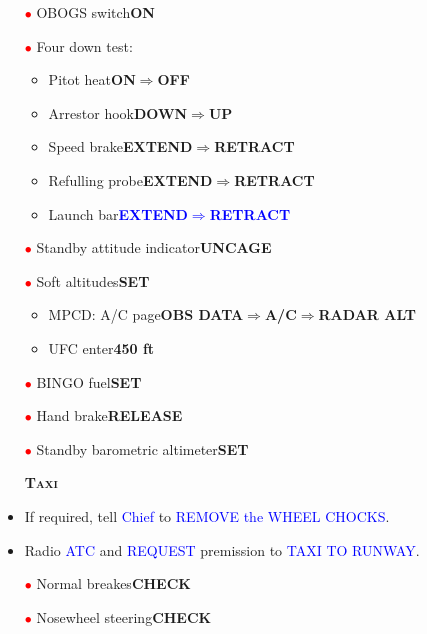 \documentclass[a4paper,12pt,dvipsnames]{letter}
\newcommand{\radio}[1]{\textcolor{blue}{#1}}
\newcommand{\button}[1]{\textbf{#1}}
\newcommand{\boat}[1]{\textcolor{Blue}{\textbf{#1}}}
\newcommand{\myHead}[1]{{\LARGE\textsc{\textbf{#1}}}}
\newcommand{\ri}{\textcolor{red}{$\bullet$\;}}
\begin{document}
{\begin{itemize}
 \begin{itemize}
  \item Stabilator\dotfill\button{12\textdegree}
 \end{itemize}
 \item[\ri] OBOGS switch\dotfill\button{ON}
 \item[\ri] Four down test:
 \begin{itemize}
  \item Pitot heat\dotfill\button{ON\;$\Rightarrow$\;OFF}
  \item Arrestor hook\dotfill\button{DOWN\;$\Rightarrow$\;UP}
  \item Speed brake\dotfill\button{EXTEND\;$\Rightarrow$\;RETRACT}
  \item Refulling probe\dotfill\button{EXTEND\;$\Rightarrow$\;RETRACT}
  \item Launch bar\dotfill\boat{EXTEND\;$\Rightarrow$\;RETRACT}
 \end{itemize}
 \item[\ri] Standby attitude indicator\dotfill\button{UNCAGE}
 \item[\ri] Soft altitudes\dotfill\button{SET}
 \begin{itemize}
  \item MPCD: A/C page\dotfill\button{OBS DATA\;$\Rightarrow$\;A/C\;$\Rightarrow$\;RADAR ALT}
  \item UFC enter\dotfill\button{450 ft}
 \end{itemize}  
 \item[\ri] BINGO fuel\dotfill\button{SET} 
 \item[\ri] Hand brake\dotfill\button{RELEASE}
 \item[\ri] Standby barometric altimeter\dotfill\button{SET}
\end{itemize}
\newpage
\begin{itemize}
 \item[] \myHead{Taxi}
 \item If required, tell \radio{Chief} to \radio{REMOVE the WHEEL CHOCKS}.
 \item Radio \radio{ATC} and \radio{REQUEST} premission to \radio{TAXI TO RUNWAY}.
 \item[\ri] Normal breakes\dotfill\button{CHECK}
 \item[\ri] Nosewheel steering\dotfill\button{CHECK}

\end{itemize}}
\end{document}
